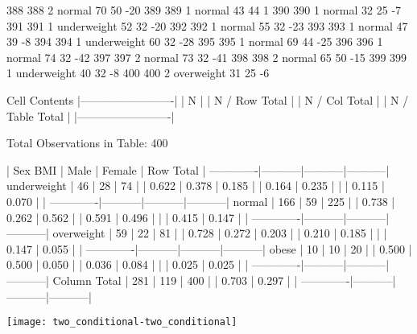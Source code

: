 \begin{Schunk}
\begin{Soutput}
388         388   2      normal  70         50          -20
389         389   1      normal  43         44            1
390         390   1      normal  32         25           -7
391         391   1 underweight  52         32          -20
392         392   1      normal  55         32          -23
393         393   1      normal  47         39           -8
394         394   1 underweight  60         32          -28
395         395   1      normal  69         44          -25
396         396   1      normal  74         32          -42
397         397   2      normal  73         32          -41
398         398   2      normal  65         50          -15
399         399   1 underweight  40         32           -8
400         400   2  overweight  31         25           -6
\end{Soutput}
\begin{Soutput}
   Cell Contents
|-------------------------|
|                       N |
|           N / Row Total |
|           N / Col Total |
|         N / Table Total |
|-------------------------|

 
Total Observations in Table:  400 

 
             | Sex 
         BMI |      Male |    Female | Row Total | 
-------------|-----------|-----------|-----------|
 underweight |        46 |        28 |        74 | 
             |     0.622 |     0.378 |     0.185 | 
             |     0.164 |     0.235 |           | 
             |     0.115 |     0.070 |           | 
-------------|-----------|-----------|-----------|
      normal |       166 |        59 |       225 | 
             |     0.738 |     0.262 |     0.562 | 
             |     0.591 |     0.496 |           | 
             |     0.415 |     0.147 |           | 
-------------|-----------|-----------|-----------|
  overweight |        59 |        22 |        81 | 
             |     0.728 |     0.272 |     0.203 | 
             |     0.210 |     0.185 |           | 
             |     0.147 |     0.055 |           | 
-------------|-----------|-----------|-----------|
       obese |        10 |        10 |        20 | 
             |     0.500 |     0.500 |     0.050 | 
             |     0.036 |     0.084 |           | 
             |     0.025 |     0.025 |           | 
-------------|-----------|-----------|-----------|
Column Total |       281 |       119 |       400 | 
             |     0.703 |     0.297 |           | 
-------------|-----------|-----------|-----------|
\end{Soutput}
\end{Schunk}
\texttt{[image: two\_conditional-two\_conditional]}
